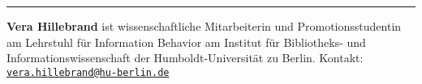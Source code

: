 \begin{center}\rule{0.5\linewidth}{\linethickness}\end{center}

\textbf{Vera Hillebrand} ist wissenschaftliche Mitarbeiterin und
Promotionsstudentin am Lehrstuhl für Information Behavior am Institut
für Bibliotheks- und Informationswissenschaft der Humboldt-Universität
zu Berlin. Kontakt:
\href{mailto:vera.hillebrand@hu-berlin.de}{\nolinkurl{vera.hillebrand@hu-berlin.de}}
